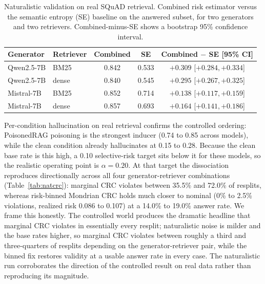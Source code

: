 \documentclass[sn-basic]{sn-jnl}
\theoremstyle{thmstyleone}
\theoremstyle{thmstyletwo}
\begin{document}
\begin{table}[tbp]
\centering\small
\caption{Naturalistic validation on real SQuAD retrieval. Combined risk
estimator versus the semantic entropy (SE) baseline on the answered
subset, for two generators and two retrievers. Combined-minus-SE shows a
bootstrap 95\% confidence interval.}
\label{tab:natauroc}
\begin{tabular}{llccc}
\toprule
Generator & Retriever & Combined & SE & Combined $-$ SE [95\% CI] \\
\midrule
Qwen2.5-7B & BM25  & 0.842 & 0.533 & $+0.309$ [$+0.284, +0.334$] \\
Qwen2.5-7B & dense & 0.840 & 0.545 & $+0.295$ [$+0.267, +0.325$] \\
Mistral-7B & BM25  & 0.852 & 0.714 & $+0.138$ [$+0.117, +0.159$] \\
Mistral-7B & dense & 0.857 & 0.693 & $+0.164$ [$+0.141, +0.186$] \\
\bottomrule
\end{tabular}
\end{table}

Per-condition hallucination on real retrieval confirms the controlled ordering: PoisonedRAG poisoning is the strongest
inducer (0.74 to 0.85 across models), while the clean condition already
hallucinates at 0.15 to 0.28. Because the clean base rate is this high, a
0.10 selective-risk target sits below it for these models, so the
realistic operating point is $\alpha = 0.20$. At that target the
dissociation reproduces directionally across all four generator-retriever
combinations (Table~\ref{tab:natcrc}): marginal CRC violates between 35.5\%
and 72.0\% of resplits, whereas risk-binned Mondrian CRC holds much closer
to nominal (0\% to 2.5\% violations, realized risk 0.086 to 0.107) at a
14.0\% to 19.0\% answer rate. We frame this honestly. The controlled world
produces the dramatic headline that marginal CRC violates in essentially
every resplit; naturalistic noise is milder and the base rates higher, so
marginal CRC violates between roughly a third and three-quarters of
resplits depending on the generator-retriever pair, while the binned fix
restores validity at a usable answer rate in every case. The naturalistic
run corroborates the direction of the controlled result on real data
rather than reproducing its magnitude.
\end{document}
